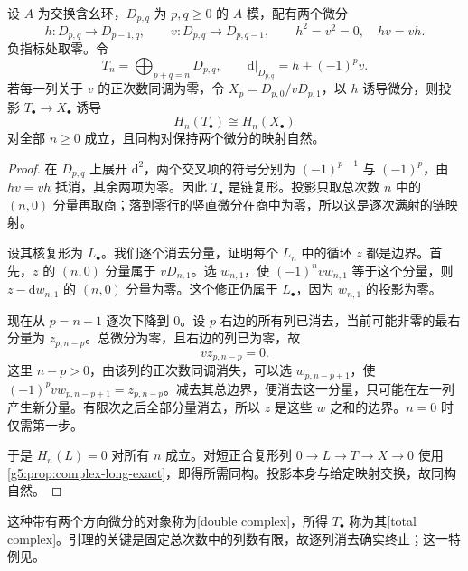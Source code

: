 \begin{lemma}\label{g5:lem:double-complex-collapse}
	设 \(A\) 为交换含幺环，\(D_{p,q}\) 为 \(p,q\geq0\) 的 \(A\) 模，配有两个微分
	\[
		h:D_{p,q}\to D_{p-1,q},\qquad
		v:D_{p,q}\to D_{p,q-1},
		\qquad h^2=v^2=0,\quad hv=vh.
	\]
	负指标处取零。令
	\[
		T_n=\bigoplus_{p+q=n}D_{p,q},\qquad
		\mathrm{d}|_{D_{p,q}}=h+(-1)^p v.
	\]
	若每一列关于 \(v\) 的正次数同调为零，令
	\(X_p=D_{p,0}/vD_{p,1}\)，以 \(h\) 诱导微分，则投影 \(T_\bullet\to X_\bullet\) 诱导
	\[
		H_n(T_\bullet)\cong H_n(X_\bullet)
	\]
	对全部 \(n\geq0\) 成立，且同构对保持两个微分的映射自然。
\end{lemma}
\begin{proof}
	在 \(D_{p,q}\) 上展开 \(\mathrm{d}^2\)，两个交叉项的符号分别为 \((-1)^{p-1}\) 与 \((-1)^p\)，由 \(hv=vh\) 抵消，其余两项为零。因此 \(T_\bullet\) 是链复形。投影只取总次数 \(n\) 中的 \((n,0)\) 分量再取商；落到零行的竖直微分在商中为零，所以这是逐次满射的链映射。

	设其核复形为 \(L_\bullet\)。我们逐个消去分量，证明每个 \(L_n\) 中的循环 \(z\) 都是边界。首先，\(z\) 的 \((n,0)\) 分量属于 \(vD_{n,1}\)。选 \(w_{n,1}\)，使 \((-1)^n v w_{n,1}\) 等于这个分量，则 \(z-\mathrm{d}w_{n,1}\) 的 \((n,0)\) 分量为零。这个修正仍属于 \(L_\bullet\)，因为 \(w_{n,1}\) 的投影为零。

	现在从 \(p=n-1\) 逐次下降到 \(0\)。设 \(p\) 右边的所有列已消去，当前可能非零的最右分量为 \(z_{p,n-p}\)。总微分为零，且右边的列已为零，故
	\[
		vz_{p,n-p}=0.
	\]
	这里 \(n-p>0\)，由该列的正次数同调消失，可以选
	\(w_{p,n-p+1}\)，使 \((-1)^p v w_{p,n-p+1}=z_{p,n-p}\)。减去其总边界，便消去这一分量，只可能在左一列产生新分量。有限次之后全部分量消去，所以 \(z\) 是这些 \(w\) 之和的边界。\(n=0\) 时仅需第一步。

	于是 \(H_n(L)=0\) 对所有 \(n\) 成立。对短正合复形列 \(0\to L\to T\to X\to0\) 使用\cref{g5:prop:complex-long-exact}，即得所需同构。投影本身与给定映射交换，故同构自然。
\end{proof}

这种带有两个方向微分的对象称为[double complex]，所得 \(T_\bullet\) 称为其[total complex]。引理的关键是固定总次数中的列数有限，故逐列消去确实终止；这一特例见\cite[附录B，定理B1，第275--276页]{Matsumura1989}。

